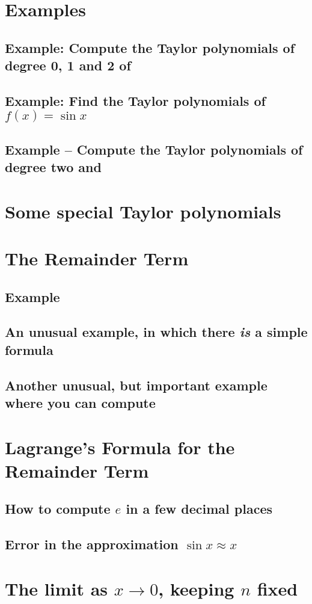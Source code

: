 \section{Examples}
\subsection{Example: Compute the Taylor polynomials of degree 0, 1 and 2 of}
\subsection{Example: Find the Taylor polynomials of $f (x)=\sin x$}
\subsection{Example -- Compute the Taylor polynomials of degree two and}
\section{Some special Taylor polynomials} \label{sec:some-special-taylor}
\section{The Remainder Term}
\subsection{Example}
\subsection{An unusual example, in which there \emph{is} a simple formula}
\subsection{Another unusual, but important example where you can compute}
\section{Lagrange's Formula for the Remainder Term}
\subsection{How to compute $e$ in a few decimal places}
\subsection{Error in the approximation $\sin x\approx x$}
\section{The limit as $x\to0$, keeping $n$ fixed }
